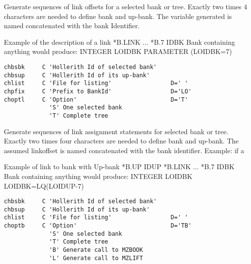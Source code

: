 Generate sequences of link offsets for a selected bank or tree.
Exactly two times 4 characters are needed to define bank and up-bank.
The variable generated is named  concatenated with the
bank Identifier.
 

\begin{XMPt}{Example of the description of a link}
         *B.LINK
         ...
         *B.7 IDBK  Bank containing anything
 {\rm would produce:}
         INTEGER LOIDBK
         PARAMETER (LOIDBK=7)
\end{XMPt}
 
 
\begin{verbatim}
chbsbk     C 'Hollerith Id of selected bank'
chbsup     C 'Hollerith Id of its up-bank'
chlist     C 'File for listing'                 D=' '
chpfix     C 'Prefix to BankId'                 D='LO'
choptl     C 'Option'                           D='T'
             'S' One selected bank
             'T' Complete tree
\end{verbatim}
 
Generate sequences of link assignment statements for selected
bank or tree.
Exactly two times four characters are needed to define bank and up-bank.
The assumed linkoffset is named  concatenated with the
bank identifier.
Example: if a 
\par
\begin{XMPt}{Example of link to bank  with Up-bank }
         *B.UP IDUP
         *B.LINK
         ...
         *B.7  IDBK  Bank containing anything
 {\rm would produce:}
         INTEGER LOIDBK
         LOIDBK=LQ(LOIDUP-7)
\end{XMPt}
 
 
\begin{verbatim}
chbsbk     C 'Hollerith Id of selected bank'
chbsup     C 'Hollerith Id of its up-bank'
chlist     C 'File for listing'                 D=' '
choptb     C 'Option'                           D='TB'
             'S' One selected bank
             'T' Complete tree
             'B' Generate call to MZBOOK
             'L' Generate call to MZLIFT
\end{verbatim}
 
